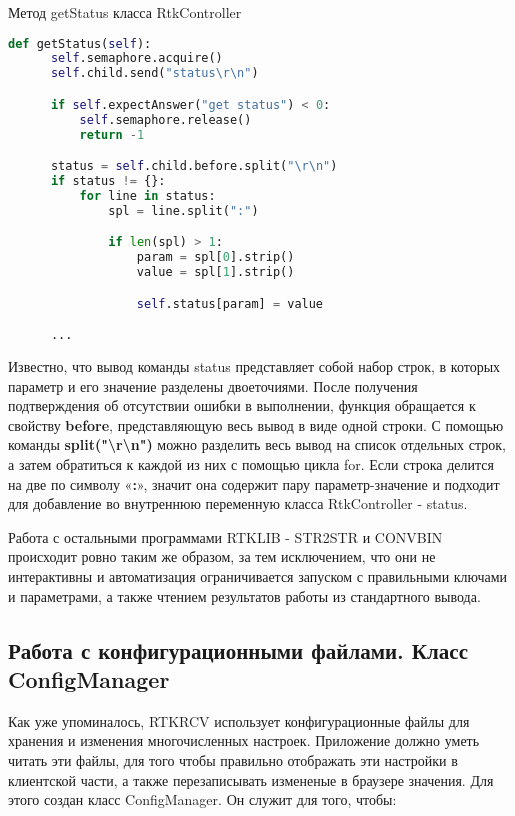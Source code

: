 \begin{ListingEnv}[H]
  \caption{Метод getStatus класса RtkController}
  \label{list:hwbeauty}
  \begin{lstlisting}[language=Python]
    def getStatus(self):
      self.semaphore.acquire()
      self.child.send("status\r\n")

      if self.expectAnswer("get status") < 0:
          self.semaphore.release()
          return -1

      status = self.child.before.split("\r\n")
      if status != {}:
          for line in status:
              spl = line.split(":")

              if len(spl) > 1:
                  param = spl[0].strip()
                  value = spl[1].strip()

                  self.status[param] = value

      ...
  \end{lstlisting}
\end{ListingEnv}

Известно, что вывод команды status представляет собой набор строк, в которых параметр и его значение разделены двоеточиями. После получения подтверждения об отсутствии ошибки в выполнении, функция обращается к свойству \textbf{before}, представляющую весь вывод в виде одной строки. С помощью команды \textbf{split("\textbackslash r\textbackslash n")} можно разделить весь вывод на список отдельных строк, а затем обратиться к каждой из них с помощью цикла for. Если строка делится на две по символу «\textbf{:}», значит она содержит пару параметр-значение и подходит для добавление во внутреннюю переменную класса RtkController - status.

Работа с остальными программами RTKLIB - STR2STR и CONVBIN происходит ровно таким же образом, за тем исключением, что они не интерактивны и автоматизация ограничивается запуском с правильными ключами и параметрами, а также чтением результатов работы из стандартного вывода.

\subsection{Работа с конфигурационными файлами. Класс ConfigManager} \label{subsect3_1_2}

Как уже упоминалось, RTKRCV использует конфигурационные файлы для хранения и изменения многочисленных настроек. Приложение должно уметь читать эти файлы, для того чтобы правильно отображать эти настройки в клиентской части, а также перезаписывать измененые в браузере значения. Для этого создан класс ConfigManager. Он служит для того, чтобы:

